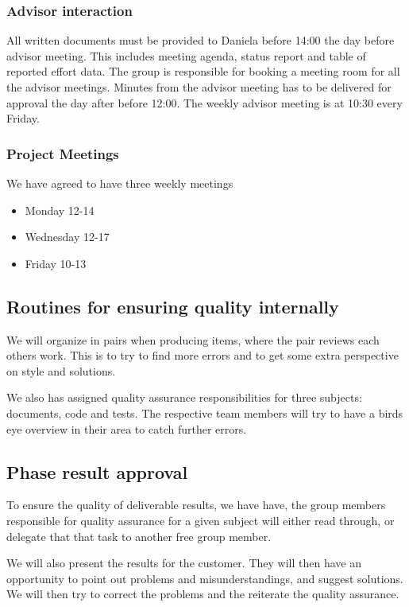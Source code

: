\subsubsection{Advisor interaction}
All written documents must be provided to Daniela before 14:00 the day before advisor meeting. This includes meeting agenda, status report and table of reported effort data. The group is responsible for booking a meeting room for all the advisor meetings. Minutes from the advisor meeting has to be delivered for approval the day after before 12:00. The weekly advisor meeting is at 10:30 every Friday. 

\subsubsection{Project Meetings}
We have agreed to have three weekly meetings
\begin{itemize}
	\item Monday 12-14
	\item Wednesday 12-17
	\item Friday 10-13
\end{itemize}

\subsection{Routines for ensuring quality internally}
We will organize in pairs when producing items, where the pair reviews each others work. This is to try to find more errors and to get some extra perspective on style and solutions.

We also has assigned quality assurance responsibilities for three subjects: documents, code and tests. The respective team members will try to have a birds eye overview in their area to catch further errors.

\subsection{Phase result approval}
To ensure the quality of deliverable results, we have have, the group members responsible for quality assurance for a given subject will either read through, or delegate that that task to another free group member.

We will also present the results for the customer. They will then have an opportunity to point out problems and misunderstandings, and suggest solutions. We will then try to correct the problems and the reiterate the quality assurance.

